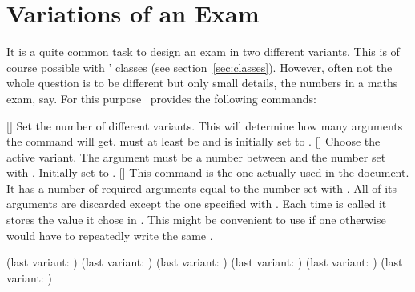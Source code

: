 \documentclass[load-preamble+,scrartcl={DIV10}]{cnltx-doc}
\begin{document}
\section{Variations of an Exam}

It is a quite common task to design an exam in two different
variants.  This is of course possible with \ExSheets' classes (see
section~\ref{sec:classes}).  However, often not the whole question is to be
different but only small details, the numbers in a maths exam, say.  For this
purpose \ExSheets\ provides the following commands:
\begin{commands}
  []
    Set the number of different variants.  This will determine how many
    arguments the command  will get.   must at least be
     and is initially set to .
  []
    Choose the active variant.  The argument must be a number between 
    and the number set with .  Initially set to .
  []
    This command is the one actually used in the document.  It has a number of
    required arguments equal to the number set with .  All
    of its arguments are discarded except the one specified with
    .
    Each time  is called it stores the value it
    chose in .  This might be convenient to use if one
    otherwise would have to repeatedly write the same .
\end{commands}

\begin{example}
  (last variant: \lastvariant)
  (last variant: \lastvariant)
  (last variant: \lastvariant)
  (last variant: \lastvariant)
  (last variant: \lastvariant)
  (last variant: \lastvariant)
\end{example}
\end{document}
